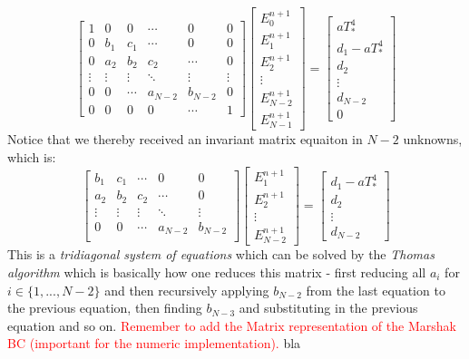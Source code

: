 \documentclass{article}
\begin{document}
\begin{equation}
\begin{bmatrix}
1 & 0 & 0 & \cdots & 0 & 0\\
0 & b_1 & c_1 & \cdots & 0 & 0 \\  
0 & a_2 & b_2 & c_2 &\cdots & 0 \\
\vdots & \vdots & \vdots & \ddots & \vdots & \vdots \\
0 & 0 & \cdots & a_{N-2} & b_{N-2} & 0  \\
0 & 0 & 0 & 0 & \cdots & 1
\end{bmatrix}
\begin{bmatrix}
E_0^{n+1} \\
E_1^{n+1} \\
E_2^{n+1} \\
\vdots \\
E_{N-2}^{n+1} \\
E_{N-1}^{n+1}
\end{bmatrix}
=
\begin{bmatrix}
aT_*^4 \\
d_1 - aT_*^4\\
d_2 \\
\vdots \\
d_{N-2} \\
0
\end{bmatrix}
\end{equation}
Notice that we thereby received an invariant matrix equaiton in $N-2$ unknowns, which is:
\begin{equation}
\begin{bmatrix}
b_1 & c_1 & \cdots & 0 & 0 \\  
a_2 & b_2 & c_2 &\cdots & 0 \\
\vdots & \vdots & \vdots & \ddots & \vdots\\
0 & 0 & \cdots & a_{N-2} & b_{N-2}   \\
\end{bmatrix}
\begin{bmatrix}
E_1^{n+1} \\
E_2^{n+1} \\
\vdots \\
E_{N-2}^{n+1} 
\end{bmatrix}
=
\begin{bmatrix}
d_1 - aT_*^4\\
d_2 \\
\vdots \\
d_{N-2}
\end{bmatrix}
\end{equation}
This is a \textit{tridiagonal system of equations} which can be solved by the \textit{Thomas algorithm} which is basically how one reduces this matrix - first reducing all $a_{i}$ for $i\in \{1,...,N-2\}$ and then recursively applying $b_{N-2}$ from the last equation to the previous equation, then finding $b_{N-3}$ and substituting in the previous equation and so on.
\textcolor{red}{Remember to add the Matrix representation of the Marshak BC (important for the numeric implementation).}
bla 
\end{document}
